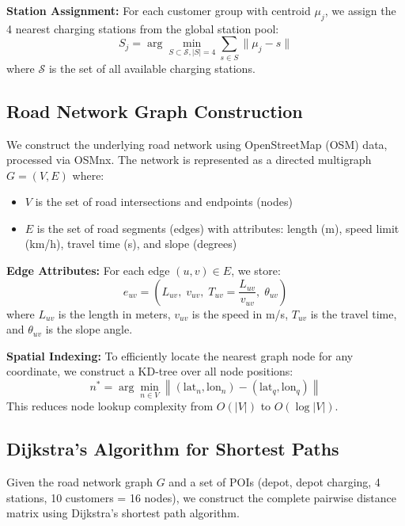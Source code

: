 \documentclass[11pt,a4paper]{article}
\begin{document}
\textbf{Station Assignment:} For each customer group with centroid $\mu_j$, we assign the 4 nearest charging stations from the global station pool:
\begin{equation}
S_j = \arg\min_{S \subset \mathcal{S}, |S|=4} \sum_{s \in S} \|\mu_j - s\|
\end{equation}
where $\mathcal{S}$ is the set of all available charging stations.

\subsection{Road Network Graph Construction}

We construct the underlying road network using OpenStreetMap (OSM) data, processed via OSMnx. The network is represented as a directed multigraph $G = (V, E)$ where:
\begin{itemize}
    \item $V$ is the set of road intersections and endpoints (nodes)
    \item $E$ is the set of road segments (edges) with attributes: length (m), speed limit (km/h), travel time (s), and slope (degrees)
\end{itemize}

\textbf{Edge Attributes:} For each edge $(u, v) \in E$, we store:
\begin{equation}
e_{uv} = \left( L_{uv}, \; v_{uv}, \; T_{uv} = \frac{L_{uv}}{v_{uv}}, \; \theta_{uv} \right)
\end{equation}
where $L_{uv}$ is the length in meters, $v_{uv}$ is the speed in m/s, $T_{uv}$ is the travel time, and $\theta_{uv}$ is the slope angle.

\textbf{Spatial Indexing:} To efficiently locate the nearest graph node for any coordinate, we construct a KD-tree over all node positions:
\begin{equation}
n^* = \arg\min_{n \in V} \left\| (\text{lat}_n, \text{lon}_n) - (\text{lat}_q, \text{lon}_q) \right\|
\end{equation}
This reduces node lookup complexity from $O(|V|)$ to $O(\log |V|)$.

\subsection{Dijkstra's Algorithm for Shortest Paths}

Given the road network graph $G$ and a set of POIs (depot, depot charging, 4 stations, 10 customers = 16 nodes), we construct the complete pairwise distance matrix using Dijkstra's shortest path algorithm.
\end{document}
